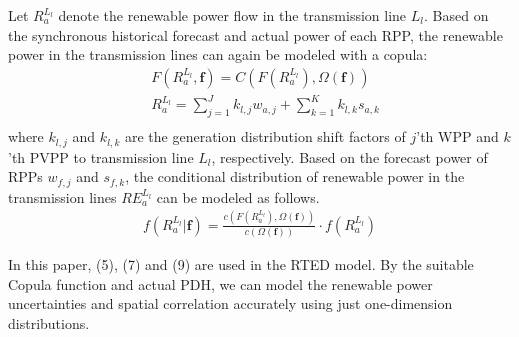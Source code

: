 Let $R_{a}^{L_l}$ denote the renewable power flow in the transmission line $L_l$.
Based on the synchronous historical forecast and actual power of each RPP, the renewable power in the transmission lines can again be modeled with a copula:
\begin{equation} \label{eq:5}
\begin{aligned}
& F(R_{a}^{L_l},\mathbf{f})= C(F(R_{a}^{L_l}),\Omega(\mathbf{f}))\\
& R_{a}^{L_l}=\sum_{j=1}^{J}k_{l,j}w_{a,j}+\sum_{k=1}^{K}k_{l,k}s_{a,k} \\
\end{aligned}
\end{equation}
{where $k_{l,j}$ and $k_{l,k}$ are the generation distribution shift factors of $j$'th WPP and $k$'th PVPP to transmission line $L_l$, respectively.}
Based on the forecast power of RPPs $w_{f,j}$ and $s_{f,k}$, the conditional distribution of renewable power in the transmission lines $RE_{a}^{L_l}$ can be modeled as follows.
\begin{equation} \label{linedistribution}
\begin{aligned}
f(R_{a}^{L_l}|\mathbf{f})
= \frac{c(F(R_{a}^{L_l}),\Omega(\mathbf{f}))}{c(\Omega(\mathbf{f}))} \cdot f(R_{a}^{L_l})
\end{aligned}
\end{equation}

In this paper, (5), (7) and (9) are used in the RTED model. By the suitable Copula function and actual PDH, we can model the renewable power uncertainties and spatial correlation accurately using just one-dimension distributions.


